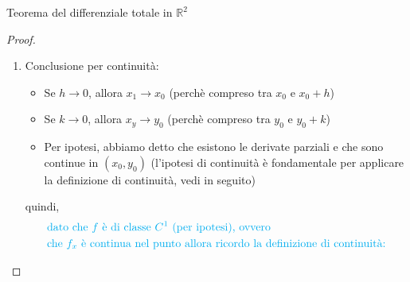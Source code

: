 \documentclass{article}  %
\begin{document}
\begin{theorem}{Teorema del differenziale totale in $\mathbb{R}^2$}
\begin{proof}
\begin{enumerate}
			      quindi ho trovato la maggiorazione tramite uguaglianza triangolare e ora studio il limite:
			      \begin{align*}
				       & \lim_{(h,k) \to (0,0)} \left| \frac{h \cdot \left[f_x(x_1,y_0+k)-f_x(x_0,y_0)\right]}{\|(h,k)\|} \right|
				      + \lim_{(h,k) \to (0,0)} \left| \frac{k \cdot \left[f_y(x_0,y_1)-f_y(x_0,y_0)\right]}{\|(h,k)\|} \right| \overset{?}{=} 0          \\
				       & \lim_{(h,k) \to (0,0)} \left(\frac{|h|}{\sqrt{h^2+k^2}}\right) \cdot \left| {f_x(x_1,y_0+k)-f_x(x_0,y_0)} \right|
				      + \lim_{(h,k) \to (0,0)} \left(\frac{|k|}{\sqrt{h^2+k^2}}\right) \cdot \left| {f_y(x_0,y_1)-f_y(x_0,y_0)} \right| \overset{?}{=} 0 \\
			      \end{align*}
			      \begin{itemize}
				      \item I seguenti rapporti valgono sempre:
				            \begin{align*}
					            \frac{|h|}{\sqrt{h^2+k^2}} \leq 1 \quad \quad \frac{|k|}{\sqrt{h^2+k^2}} \leq 1
				            \end{align*}
			      \end{itemize}
			      quindi,
			      \begin{align*}
				      \lim_{(h,k) \to (0,0)} 1 \cdot \left| {f_x(x_1,y_0+k)-f_x(x_0,y_0)} \right|
				      + \lim_{(h,k) \to (0,0)} 1 \cdot \left| {f_y(x_0,y_1)-f_y(x_0,y_0)} \right| \overset{?}{=} 0
			      \end{align*}
			\item Conclusione per continuità:
			      \begin{itemize}
				      \item Se $h \to 0$, allora $x_1 \to x_0$ (perchè compreso tra $x_0$ e $x_0+h$)
				      \item Se $k \to 0$, allora $x_y \to y_0$ (perchè compreso tra $y_0$ e $y_0+k$)
				      \item Per ipotesi, abbiamo detto che esistono le derivate parziali e che sono continue in $(x_0,y_0)$ (l'ipotesi di continuità è fondamentale per applicare
				            la definizione di continuità, vedi in seguito)
			      \end{itemize}
			      quindi,
			      \begin{align*}
				       & \textcolor{cyan}{\text{dato che $f$ è di classe $C^1$ (per ipotesi), ovvero}}                        \\
				       & \textcolor{cyan}{\text{che $f_x$ è continua nel punto allora ricordo la definizione di continuità:}} \\

\end{align*}
\end{enumerate}
\end{proof}
\end{theorem}
\end{document}
